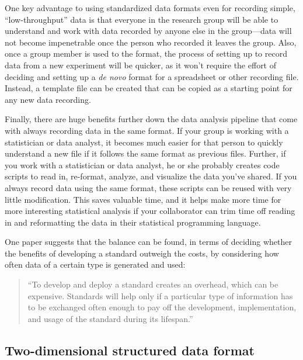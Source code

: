 \documentclass[]{tufte-book}
\begin{document}
One key advantage to using standardized data formats even for recording simple,
``low-throughput'' data is that everyone in the research group will be able to
understand and work with data recorded by anyone else in the group---data will
not become impenetrable once the person who recorded it leaves the group. Also,
once a group member is used to the format, the process of setting up to record
data from a new experiment will be quicker, as it won't require the effort of
deciding and setting up a \emph{de novo} format for a spreadsheet or other recording
file. Instead, a template file can be created that can be copied as a starting
point for any new data recording.

Finally, there are huge benefits further down the data analysis pipeline that
come with always recording data in the same format. If your group is working
with a statistician or data analyst, it becomes much easier for that person to
quickly understand a new file if it follows the same format as previous files.
Further, if you work with a statistician or data analyst, he or she probably
creates code scripts to read in, re-format, analyze, and visualize the data
you've shared. If you always record data using the same format, these scripts
can be reused with very little modification. This saves valuable time, and it
helps make more time for more interesting statistical analysis if your
collaborator can trim time off reading in and reformatting the data in their
statistical programming language.

One paper suggests that the balance can be found, in terms of deciding whether
the benefits of developing a standard outweigh the costs, by considering how
often data of a certain type is generated and used:

\begin{quote}
``To develop and deploy a standard creates an overhead, which can be expensive.
Standards will help only if a particular type of information has to be
exchanged often enough to pay off the development, implementation, and usage
of the standard during its lifespan.'' \citep{brazma2006standards}
\end{quote}

\hypertarget{two-dimensional-structured-data-format}{%
\subsection{Two-dimensional structured data format}\label{two-dimensional-structured-data-format}}
\end{document}
